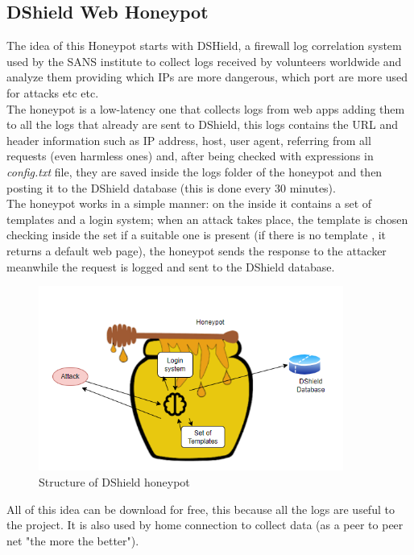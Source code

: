 \subsection{DShield Web Honeypot}
The idea of this Honeypot starts with DSHield, a firewall log correlation system used by the SANS institute to collect logs received by volunteers worldwide and analyze them providing which IPs are more dangerous, which port are more used for attacks etc etc.\\
The honeypot is a low-latency one that collects logs from web apps adding them to all the logs that already are sent to DShield, this logs contains the URL and header information  such as IP address, host, user agent, referring from all requests (even harmless ones) and, after being checked with expressions in \textit{config.txt} file, they are saved inside the logs folder of the honeypot and then posting it to the DShield database (this is done every 30 minutes).\\
The honeypot works in a simple manner: on the inside it contains a set of templates and a login system; when an attack takes place, the template is chosen checking inside the set if a suitable one is present (if there is no template , it returns a default web page), the honeypot sends the response to the attacker meanwhile the request is logged and sent to the DShield database.

\begin{figure}[h!]
  \centering
   \includegraphics[width=10cm]{images/DSHoneypot.png}
   \caption{Structure of DShield honeypot}
  \label{fig:irradiances}
\end{figure}
\FloatBarrier


All of this idea can be download for free, this because all the logs are useful to the project. It is also used by home connection to collect data (as a peer to peer net "the more the better").


